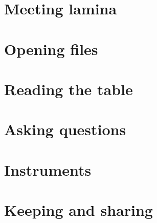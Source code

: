 \part{Meeting lamina}




\part{Opening files}





\part{Reading the table}




\part{Asking questions}




\part{Instruments}






\part{Keeping and sharing}




\appendix




